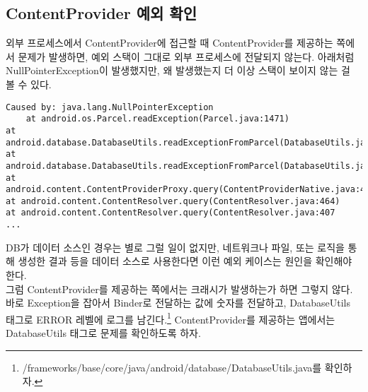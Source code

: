 \subsection{ContentProvider 예외 확인}
외부 프로세스에서 ContentProvider에 접근할 때 ContentProvider를 제공하는 쪽에서 문제가 발생하면, 예외 스택이 그대로 외부 프로세스에 전달되지 않는다.
아래처럼 NullPointerException이 발생했지만, 왜 발생했는지 더 이상 스택이 보이지 않는 걸 볼 수 있다.
\begin{lstlisting}[frame=single] 
Caused by: java.lang.NullPointerException 
	at android.os.Parcel.readException(Parcel.java:1471) 
at android.database.DatabaseUtils.readExceptionFromParcel(DatabaseUtils.java:185) 
at android.database.DatabaseUtils.readExceptionFromParcel(DatabaseUtils.java:137) 
at android.content.ContentProviderProxy.query(ContentProviderNative.java:413) 
at android.content.ContentResolver.query(ContentResolver.java:464) 
at android.content.ContentResolver.query(ContentResolver.java:407
...
\end{lstlisting}
DB가 데이터 소스인 경우는 별로 그럴 일이 없지만, 네트워크나 파일, 또는 로직을 통해 생성한 결과 등을 데이터 소스로 사용한다면 이런 예외 케이스는 원인을 확인해야 한다.\\

그럼 ContentProvider를 제공하는 쪽에서는 크래시가 발생하는가 하면 그렇지 않다. 바로 Exception을 잡아서 Binder로 전달하는 값에 숫자를 전달하고, DatabaseUtils 태그로 ERROR 레벨에 로그를 남긴다.\footnote{/frameworks/base/core/java/android/database/DatabaseUtils.java를 확인하자.}
ContentProvider를 제공하는 앱에서는 DatabaseUtils 태그로 문제를 확인하도록 하자.

